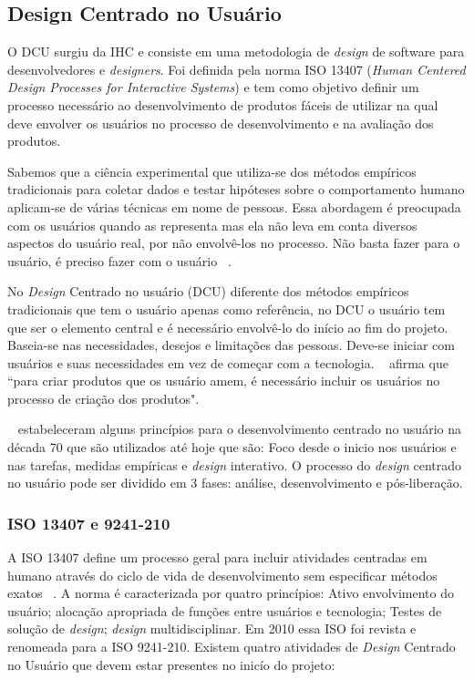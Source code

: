 \subsection{Design Centrado no Usuário}

O DCU surgiu da IHC e consiste em uma metodologia de \emph{design} de software para desenvolvedores e \emph{designers}. Foi definida pela norma ISO 13407 (\textit{Human Centered Design Processes for Interactive Systems}) e tem como objetivo definir um processo necessário ao desenvolvimento de produtos fáceis de utilizar na qual deve envolver os usuários no processo de desenvolvimento e na avaliação dos produtos.

Sabemos que a ciência experimental que utiliza-se dos métodos empíricos tradicionais para coletar dados e testar hipóteses sobre o comportamento humano aplicam-se de várias técnicas em nome de pessoas. Essa abordagem é preocupada com os usuários quando as representa mas ela não leva em conta diversos aspectos do usuário real, por não envolvê-los no processo. Não basta fazer para o usuário, é preciso fazer com o usuário ~\cite{eason1995}. 

No \emph{Design} Centrado no usuário (DCU) diferente dos métodos empíricos tradicionais que tem o usuário apenas como  referência, no DCU o usuário tem que ser o elemento central e é necessário envolvê-lo do início ao fim do projeto. Baseia-se nas necessidades, desejos e limitações das pessoas. Deve-se iniciar com usuários e suas necessidades em vez de começar com a tecnologia. ~ afirma que ``para criar produtos que os usuário amem, é necessário incluir os usuários no processo de criação dos produtos". 

~ estabeleceram alguns princípios para o desenvolvimento centrado no usuário na década 70 que são utilizados até hoje que são: Foco desde o inicio nos usuários e nas tarefas, medidas empíricas e \emph{design} interativo. O processo do \emph{design} centrado no usuário pode ser dividido em 3 fases: análise, desenvolvimento e pós-liberação. 


\subsubsection{ISO 13407 e 9241-210}
	
A ISO 13407 define um processo geral para incluir atividades centradas em humano através do ciclo de vida de desenvolvimento sem especificar métodos exatos ~\cite{santos2012}.
%
A norma é caracterizada por quatro princípios: Ativo envolvimento do usuário; alocação apropriada de funções entre usuários e tecnologia; Testes de solução de \emph{design}; \emph{design} multidisciplinar. Em 2010 essa ISO foi revista e renomeada para a ISO 9241-210.
%
Existem quatro atividades de \emph{Design} Centrado no Usuário que devem estar presentes no inicío do projeto:

